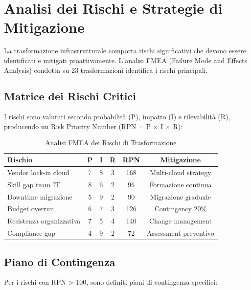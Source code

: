 \section{\texorpdfstring{\textbf{Analisi dei Rischi e Strategie di Mitigazione}}{3.7 - Analisi dei Rischi e Strategie di Mitigazione}}

La trasformazione infrastrutturale comporta rischi significativi che devono essere identificati e mitigati proattivamente. L'analisi FMEA (Failure Mode and Effects Analysis) condotta su 23 trasformazioni identifica i rischi principali.

\subsection{\texorpdfstring{\textbf{Matrice dei Rischi Critici}}{3.7.1 - Matrice dei Rischi Critici}}

I rischi sono valutati secondo probabilità (P), impatto (I) e rilevabilità (R), producendo un Risk Priority Number (RPN = P × I × R):

\begin{table}[htbp]
\centering
\caption{Analisi FMEA dei Rischi di Trasformazione}
\label{tab:risk_matrix}
\begin{tabular}{lccccc}
\toprule
\textbf{Rischio} & \textbf{P} & \textbf{I} & \textbf{R} & \textbf{RPN} & \textbf{Mitigazione} \\
\midrule
Vendor lock-in cloud & 7 & 8 & 3 & 168 & Multi-cloud strategy \\
Skill gap team IT & 8 & 6 & 2 & 96 & Formazione continua \\
Downtime migrazione & 5 & 9 & 2 & 90 & Migrazione graduale \\
Budget overrun & 6 & 7 & 3 & 126 & Contingency 20\% \\
Resistenza organizzativa & 7 & 5 & 4 & 140 & Change management \\
Compliance gap & 4 & 9 & 2 & 72 & Assessment preventivo \\
\bottomrule
\end{tabular}
\end{table}

\subsection{\texorpdfstring{\textbf{Piano di Contingenza}}{3.7.2 - Piano di Contingenza}}

Per i rischi con RPN > 100, sono definiti piani di contingenza specifici:

